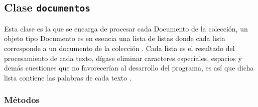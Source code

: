 \documentclass[10pt]{extarticle}
\begin{document}
    \subsection{Clase \texttt{documentos}}\label{sub:documentos}
    Esta clase es la que se encarga de procesar cada Documento de la colección, un objeto tipo 
    Documento es en esencia una lista de listas donde cada lista corresponde a un documento de la 
    colección . Cada lista es el resultado del procesamiento de cada texto, dígase eliminar caracteres 
    especiales, espacios y demás cuestiones que no favorecerían al desarrollo del programa, es así que 
    dicha lista contiene las palabras de cada texto .
    
   \subsubsection{Métodos}
   
\end{document}
